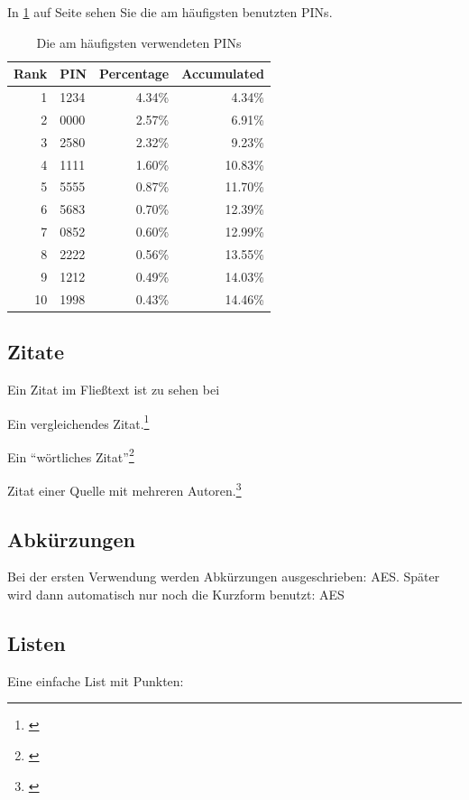In \cref{tab:pin} auf Seite \pageref{tab:pin} sehen Sie die am häufigsten benutzten PINs.

\begin{table}[hbt]
\centering
\begin{minipage}[t]{.5\textwidth} %
\caption{Die am häufigsten verwendeten PINs} %
\begin{tabularx}{\columnwidth}{rXrr}
\toprule
Rank & PIN & Percentage & Accumulated \\
\midrule
1 & 1234 & 4.34\% & 4.34\%\\
2 & 0000 & 2.57\% & 6.91\%\\
3 & 2580 & 2.32\% & 9.23\%\\
4 & 1111 & 1.60\% & 10.83\%\\
5 & 5555 & 0.87\% & 11.70\%\\
6 & 5683 & 0.70\% & 12.39\%\\
7 & 0852 & 0.60\% & 12.99\%\\
8 & 2222 & 0.56\% & 13.55\%\\
9 & 1212 & 0.49\% & 14.03\%\\
10 & 1998 & 0.43\% & 14.46\%\\
\bottomrule
\end{tabularx}
\label{tab:pin}
\end{minipage}
\end{table}

\subsection{Zitate}

Ein Zitat im Fließtext ist zu sehen bei

Ein vergleichendes Zitat.\footnote{\cite[vgl.][5\psqq]{Maslennikov2011}}

Ein \enquote{wörtliches Zitat}\footnote{\cite[13\psq]{Meier2010}}

Zitat einer Quelle mit mehreren Autoren.\footnote{\cite[vgl.][32\psqq]{Hocking2011a}}


\subsection{Abkürzungen}
Bei der ersten Verwendung werden Abkürzungen ausgeschrieben: \gls{AES}.
Später wird dann automatisch nur noch die Kurzform benutzt: \gls{AES}


\subsection{Listen}
\label{sec:Listen}
Eine einfache List mit Punkten:

